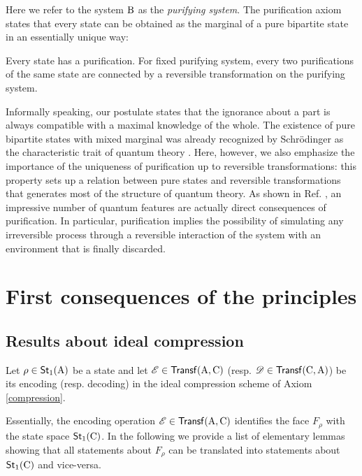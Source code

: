 \documentclass[12pt,aps,pra,showpacs,groupedaddress]{revtex4-1}
\def\rB{{\rm B}}
\def\rC{{\rm C}}
\def\Stset{{\mathsf{St}}}
\def\Trnset{{\mathsf{Transf}}}
\begin{document}
Here we refer to the system $\rB$ as the \emph{purifying system}.  The
purification axiom states that every state can be obtained as the
marginal of a pure bipartite state in an essentially unique way:
\begin{postulate}[Purification]
  Every state has a purification.  For fixed purifying system, every two purifications of the same
  state are connected by a reversible transformation on the purifying system.
\label{purification}
\end{postulate}
Informally speaking, our postulate states that the ignorance about a
part is always compatible with a maximal knowledge of the whole.  The
existence of pure bipartite states with mixed marginal was already
recognized by Schr\"odinger as the characteristic trait of quantum
theory \cite{Schr35}.  Here, however, we also emphasize the importance
of the uniqueness of purification up to reversible transformations:
this property sets up a relation between pure states and reversible
transformations that generates most of the structure of quantum
theory.  As shown in Ref. \cite{purification}, an impressive number of
quantum features are actually direct consequences of purification. In
particular, purification implies the possibility of simulating any
irreversible process through a reversible interaction of the system
with an environment that is finally discarded.



\section{First consequences of the principles}\label{sec:consequences}

 







\subsection{Results about ideal compression}  
Let $\rho \in\Stset_1 (\rA)$ be a state and let $\tE \in\Trnset(\rA,\rC)$ (resp.
$\tD\in\Trnset(\rC,\rA)$) be its encoding (resp. decoding) in the ideal compression scheme of Axiom
\ref{compression}.

Essentially, the encoding operation $\tE\in\Trnset (\rA,\rC)$ identifies the face $F_\rho$ with the
state space $\Stset_1 (\rC)$.  In the following we provide a list of elementary lemmas showing that all
statements about $F_\rho$ can be translated into statements about $\Stset_1(\rC)$ and vice-versa.
\end{document}
